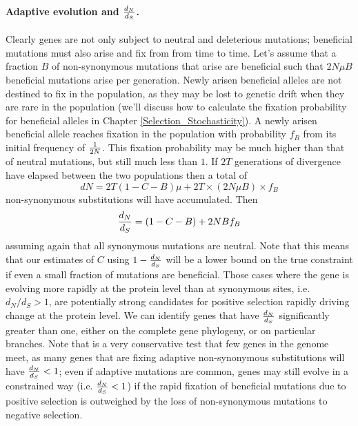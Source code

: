 \paragraph{Adaptive evolution and $\dNdS$.}
Clearly genes are not only subject to neutral and deleterious mutations; beneficial mutations must also arise and fix from from time to time. 
Let's assume that a fraction $B$ of non-synonymous mutations that arise are
beneficial such that $2 N \mu B$ beneficial mutations arise per generation. Newly arisen beneficial alleles are not destined to fix in the population, as they may be lost to genetic drift when they are rare in the population (we'll
discuss how to calculate the fixation probability for beneficial
alleles in Chapter \ref{Selection_Stochasticity}). A newly arisen beneficial allele reaches fixation in the population with probability $f_B$ from its initial frequency of $\nicefrac{1}{2N}$. This fixation
probability may be much higher than that of neutral mutations, but still much less than $1$.  If $2T$ generations of divergence have
elapsed between the two populations then a total of
\begin{equation}
dN=2T (1-C - B) \mu  + 2T \times (2 N \mu B) \times  f_B
\end{equation}
non-synonymous substitutions will have accumulated.
Then
\begin{equation} 
\dNdS = (1-C-B) +  2 N B f_B
\end{equation}
assuming again that all synonymous mutations are neutral. Note that this means that our estimates of $C$ using $1-\dNdS$ will be
a  lower bound on the true constraint if even a small fraction of
mutations are beneficial. Those cases where the gene is evolving more rapidly at the protein level than at synonymous
sites, i.e. $d_N/d_S > 1$, are potentially strong candidates for  positive selection rapidly driving change at the protein level. We can identify genes that have $\dNdS$ significantly greater than one, either on the complete gene phylogeny, or on particular branches. Note that is a very conservative test that few genes in the genome meet, as many genes that are fixing adaptive non-synonymous substitutions will have $\dNdS<1$;  even if adaptive mutations are common, genes may still evolve in a constrained way (i.e. $\dNdS<1$) if
the rapid fixation of beneficial mutations due to positive selection is outweighed by the loss of non-synonymous mutations to negative selection.


